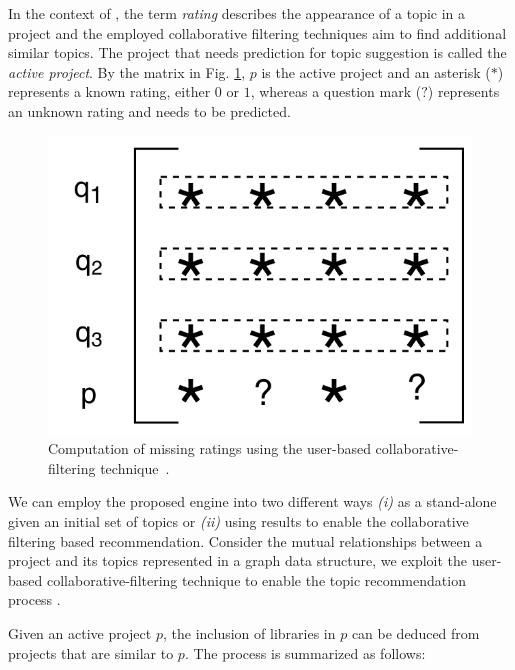 In the context of \CT, the term \emph{rating} describes the appearance of a topic in a project and the employed collaborative filtering techniques aim to find additional similar topics. The project that needs prediction for topic suggestion is called the \emph{active project}. By the matrix in Fig. \ref{fig:UserBasedCF}, $p$ is the active project and an asterisk ($*$) represents a known rating, either $0$ or $1$, whereas a question mark ($?$) represents an unknown rating and needs to be predicted.



\begin{figure}[t!]
\centering
\includegraphics[width=0.7\linewidth]{figs/matrix.pdf}
\vspace{-.4cm}
\caption{Computation of missing ratings using the user-based collaborative-filtering technique~\cite{Zhao:2010:UCR:1748610.1749278}.}%
\vspace{-.1cm}
\label{fig:UserBasedCF}
\end{figure}



We can employ the proposed engine into two different ways \emph{(i)} as a stand-alone given an initial set of topics or \emph{(ii)} using \MNB results to enable the collaborative filtering based recommendation. Consider the mutual relationships between a project and its topics represented in a graph data structure, we exploit the user-based collaborative-filtering technique to enable the topic recommendation process \cite{Linden:2003:ARI:642462.642471,Zhao:2010:UCR:1748610.1749278}. 


Given an active project $p$, the inclusion of libraries in $p$ can be deduced from projects that are similar to $p$. The process is summarized as follows: 

